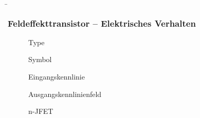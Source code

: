 \begin{frame}
    \b{
        \frametitle{Feldeffekttransistor -- Elektrisches Verhalten}
        \begin{table}[H]
            \begin{figure}[H]
                \begin{minipage}[c]{0.1\textwidth}
                    \centering
                    Type
                \end{minipage}
                \begin{minipage}[c]{0.2\textwidth}
                    \centering
                    Symbol
                \end{minipage}
                \begin{minipage}[c]{0.33\textwidth}
                    \centering
                    Eingangskennlinie
                \end{minipage}
                \begin{minipage}[c]{0.33\textwidth}
                    \centering
                    Ausgangskennlinienfeld
                \end{minipage}
            \end{figure}
            \begin{figure}[H]
                \begin{minipage}[c]{0.1\textwidth}
                    \centering
                    n-JFET
                \end{minipage}
                \begin{minipage}[c]{0.2\textwidth}
                    \centering
                    
                \end{minipage}
                \begin{minipage}[c]{0.33\textwidth}
                    \centering
                    
                \end{minipage}
                \begin{minipage}[c]{0.33\textwidth}
                    \centering
                    
                \end{minipage}
            \end{figure}
            \begin{figure}[H]
                \begin{minipage}[c]{0.1\textwidth}

\end{minipage}
\end{figure}
\end{table}}
\end{frame}

